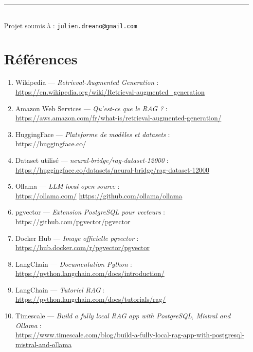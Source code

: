 \documentclass[12pt,a4paper]{report}
\begin{document}
\vspace{1.5cm}
\begin{center}
  \textcolor{darkgray}{\rule{10cm}{0.4pt}}\\
  \vspace{0.4cm}
  \small Projet soumis à : \texttt{julien.dreano@gmail.com}
\end{center}

\chapter*{Références}

\begin{enumerate}[leftmargin=1.5cm]
  \item Wikipedia — \textit{Retrieval-Augmented Generation} :\\
        \url{https://en.wikipedia.org/wiki/Retrieval-augmented_generation}

  \item Amazon Web Services — \textit{Qu'est-ce que le RAG ?} :\\
        \url{https://aws.amazon.com/fr/what-is/retrieval-augmented-generation/}

  \item HuggingFace — \textit{Plateforme de modèles et datasets} :\\
        \url{https://huggingface.co/}

  \item Dataset utilisé — \textit{neural-bridge/rag-dataset-12000} :\\
        \url{https://huggingface.co/datasets/neural-bridge/rag-dataset-12000}

  \item Ollama — \textit{LLM local open-source} :\\
        \url{https://ollama.com/} \quad \url{https://github.com/ollama/ollama}

  \item pgvector — \textit{Extension PostgreSQL pour vecteurs} :\\
        \url{https://github.com/pgvector/pgvector}

  \item Docker Hub — \textit{Image officielle pgvector} :\\
        \url{https://hub.docker.com/r/pgvector/pgvector}

  \item LangChain — \textit{Documentation Python} :\\
        \url{https://python.langchain.com/docs/introduction/}

  \item LangChain — \textit{Tutoriel RAG} :\\
        \url{https://python.langchain.com/docs/tutorials/rag/}

  \item Timescale — \textit{Build a fully local RAG app with PostgreSQL, Mistral and Ollama} :\\
        \url{https://www.timescale.com/blog/build-a-fully-local-rag-app-with-postgresql-mistral-and-ollama}
\end{enumerate}
\end{document}
